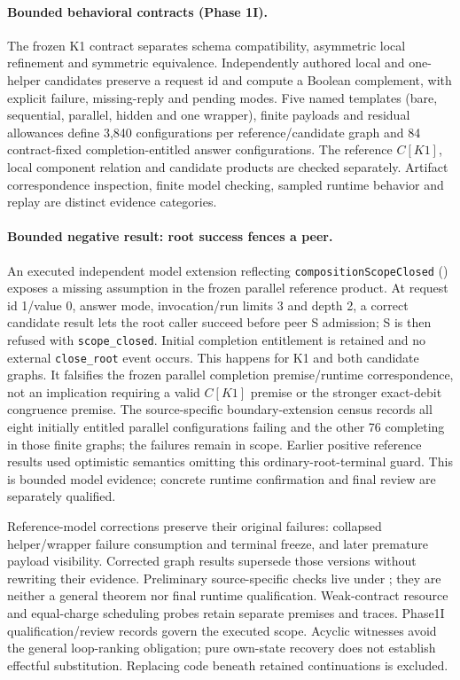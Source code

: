 \documentclass[11pt,a4paper]{article}
\theoremstyle{definition}
\theoremstyle{remark}
\begin{document}
\paragraph{Bounded behavioral contracts (Phase 1I).} The frozen K1 contract separates schema compatibility, asymmetric local refinement and symmetric equivalence. Independently authored local and one-helper candidates preserve a request id and compute a Boolean complement, with explicit failure, missing-reply and pending modes. Five named templates (bare, sequential, parallel, hidden and one wrapper), finite payloads and residual allowances define 3,840 configurations per reference/candidate graph and 84 contract-fixed completion-entitled answer configurations. The reference $C[K1]$, local component relation and candidate products are checked separately. Artifact correspondence inspection, finite model checking, sampled runtime behavior and replay are distinct evidence categories.

\paragraph{Bounded negative result: root success fences a peer.} An executed independent model extension reflecting \texttt{compositionScopeClosed} () exposes a missing assumption in the frozen parallel reference product. At request id 1/value 0, answer mode, invocation/run limits 3 and depth 2, a correct candidate result lets the root caller succeed before peer S admission; S is then refused with \texttt{scope\_closed}. Initial completion entitlement is retained and no external \texttt{close\_root} event occurs. This happens for K1 and both candidate graphs. It falsifies the frozen parallel completion premise/runtime correspondence, not an implication requiring a valid $C[K1]$ premise or the stronger exact-debit congruence premise. The source-specific boundary-extension census records all eight initially entitled parallel configurations failing and the other 76 completing in those finite graphs; the failures remain in scope. Earlier positive reference results used optimistic semantics omitting this ordinary-root-terminal guard. This is bounded model evidence; concrete runtime confirmation and final review are separately qualified.

Reference-model corrections preserve their original failures: collapsed helper/wrapper failure consumption and terminal freeze, and later premature payload visibility. Corrected graph results supersede those versions without rewriting their evidence. Preliminary source-specific checks live under ; they are neither a general theorem nor final runtime qualification. Weak-contract resource and equal-charge scheduling probes retain separate premises and traces. Phase1I qualification/review records govern the executed scope. Acyclic witnesses avoid the general loop-ranking obligation; pure own-state recovery does not establish effectful substitution. Replacing code beneath retained continuations is excluded.
\end{document}
